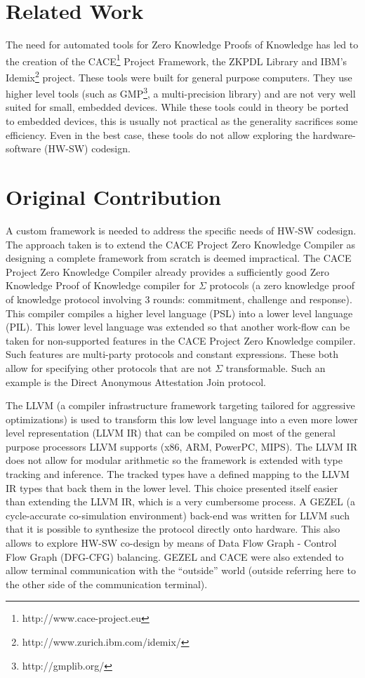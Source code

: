 \section{Related Work}

The need for automated tools for Zero Knowledge Proofs of Knowledge
has led to the creation of the
CACE\footnote{http://www.cace-project.eu} Project Framework, the ZKPDL
Library and IBM's Idemix\footnote{http://www.zurich.ibm.com/idemix/}
project. These tools were built for general purpose computers. They
use higher level tools (such as GMP\footnote{http://gmplib.org/}, a
multi-precision library) and are not very well suited for small,
embedded devices. While these tools could in theory be ported to
embedded devices, this is usually not practical as the generality
sacrifices some efficiency. Even in the best case, these tools do not
allow exploring the hardware-software (HW-SW) codesign.

\section{Original Contribution}

A custom framework is needed to address the specific needs of HW-SW
codesign. The approach taken is to extend the CACE Project Zero
Knowledge Compiler as designing a complete framework from scratch is
deemed impractical. The CACE Project Zero Knowledge Compiler already
provides a sufficiently good Zero Knowledge Proof of Knowledge
compiler for $\Sigma$ protocols (a zero knowledge proof of knowledge
protocol involving 3 rounds: commitment, challenge and response). This
compiler compiles a higher level language (PSL) into a lower level
language (PIL). This lower level language was extended so that another
work-flow can be taken for non-supported features in the CACE Project
Zero Knowledge compiler. Such features are multi-party protocols and
constant expressions. These both allow for specifying other protocols
that are not $\Sigma$ transformable. Such an example is the Direct
Anonymous Attestation Join protocol.

The LLVM (a compiler infrastructure framework targeting tailored for
aggressive optimizations) is used to transform this low level language
into a even more lower level representation (LLVM IR) that can be
compiled on most of the general purpose processors LLVM supports (x86,
ARM, PowerPC, MIPS). The LLVM IR does not allow for modular arithmetic
so the framework is extended with type tracking and inference. The
tracked types have a defined mapping to the LLVM IR types that back
them in the lower level. This choice presented itself easier than
extending the LLVM IR, which is a very cumbersome process. A GEZEL (a
cycle-accurate co-simulation environment) back-end was written for
LLVM such that it is possible to synthesize the protocol directly onto
hardware. This also allows to explore HW-SW co-design by means of Data
Flow Graph - Control Flow Graph (DFG-CFG) balancing. GEZEL and CACE
were also extended to allow terminal communication with the
``outside'' world (outside referring here to the other side of the
communication terminal).

